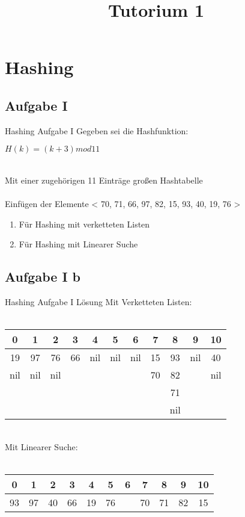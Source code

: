 
\title[Algorithmen I SS 14]{Tutorium 1}


\section{Hashing}
	\subsection{Aufgabe I}
	\begin{frame}{Hashing Aufgabe I}
		Gegeben sei die Hashfunktion: \\
		\begin{center}
			$ H(k) = (k+3) mod 11$ 
		\end{center}
		\ \\
		Mit einer zugehörigen 11 Einträge großen Hashtabelle \\
		\ \\
		Einfügen der Elemente < 70, 71, 66, 97, 82, 15, 93, 40, 19, 76 >
		\\
		\begin{enumerate}
			\item Für Hashing mit verketteten Listen
			\item Für Hashing mit Linearer Suche
		\end{enumerate}

	\end{frame}

	\subsection{Aufgabe I b}	
	\begin{frame}{Hashing Aufgabe I Lösung}
		Mit Verketteten Listen:
		\ \\
		\ \\
		\begin{tabular*}{0.75\textwidth}{  c | c | c | c | c | c | c | c | c | c | c  }
			0 & 1 & 2 & 3 & 4 & 5 & 6 & 7 & 8 & 9 & 10 \\
			\hline
			19 & 97 & 76 & 66 & nil & nil & nil & 15 & 93 & nil & 40 \\
			 nil & nil & nil &  &  &  &  & 70 & 82 &  & nil \\
			  &  &  &  &  &  &  &  & 71 &  &  \\
 			  &  &  &  &  &  &  &  & nil &  &  \\

			
		\end{tabular*}
		\ \\
		\parskip 16pt
		Mit Linearer Suche:
		\ \\
		\ \\
		\begin{tabular*}{0.75\textwidth}{  c | c | c | c | c | c | c | c | c | c | c  }
			0 & 1 & 2 & 3 & 4 & 5 & 6 & 7 & 8 & 9 & 10 \\
			\hline
			93 & 97 & 40 & 66 & 19 & 76 &  & 70 & 71 & 82 & 15 \\			
		\end{tabular*}

	\end{frame}


